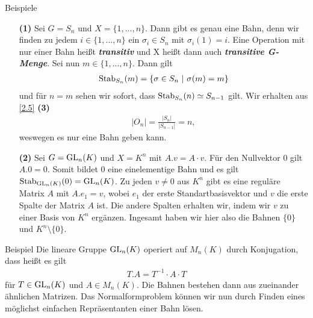 \begin{genericdf}{Beispiele}\label{2.6} \
\begin{enumerate}
	\item[\textbf{(1)}] 
	Sei $G = S_n$ und $X= \lbrace 1,...,n \rbrace$.
	Dann gibt es genau eine Bahn, denn wir finden zu jedem $i \in \lbrace 1,...,n \rbrace$ ein
	$\sigma_i \in S_n$ mit $\sigma_i(1) = i$.
	Eine Operation mit nur einer Bahn heißt \textbf{\textit{transitiv}} und X heißt dann auch 
	\textbf{\textit{transitive G-Menge}}.
	Sei nun $m \in \lbrace 1,...,n \rbrace$. Dann gilt
	\begin{align*}
	\operatorname{Stab}_{S_n}(m) = \lbrace \sigma \in S_n \ | \ \sigma(m) = m \rbrace
	\end{align*}
	und für $n = m$ sehen wir sofort, dass $\operatorname{Stab}_{S_n}(n) \simeq S_{n-1}$ gilt.
	Wir erhalten aus \ref{2.5} \textbf{(3)}
	\begin{align*}
	|O_n| = \frac{|S_n|}{|S_{n-1}|} = n,
	\end{align*}
	weswegen es nur eine Bahn geben kann.
\item[\textbf{(2)}]
	Sei $G = \operatorname{GL}_n(K)$ und $X = K^n$ mit $A.v = A \cdot v$.
	Für den Nullvektor $0$ gilt $A.0 = 0$.
	Somit bildet $0$ eine einelementige Bahn und es gilt 
	$\operatorname{Stab}_{\operatorname{GL}_n(K)}(0) = \operatorname{GL}_n(K)$.
	Zu jeden $v \neq 0 $ aus $K^n$ gibt es eine reguläre Matrix $A$ mit $A.e_1 = v$,
	wobei $e_1$ der erste Standartbasisvektor und $v$ die erste Spalte der Matrix $A$ ist.
	Die andere Spalten erhalten wir, indem wir $v$ zu einer Basis von $K^n$ ergänzen.
	Ingesamt haben wir hier also die Bahnen $\lbrace 0 \rbrace$ und $K^n \setminus \lbrace 0 \rbrace$.
\end{enumerate}
\end{genericdf}

\begin{genericdf}{Beispiel}\label{2.7}
Die lineare Gruppe $\operatorname{GL}_n(K)$ operiert auf $M_n(K)$ durch Konjugation, dass heißt es gilt
\begin{align*}
T.A = T^{-1}\cdot A \cdot T
\end{align*}
für $T \in \operatorname{GL}_n(K)$ und $A \in M_n(K)$.
Die Bahnen bestehen dann aus zueinander ähnlichen Matrizen. 
Das Normalformproblem können wir nun durch Finden eines möglichst einfachen Repräsentanten einer Bahn lösen.
\end{genericdf}

